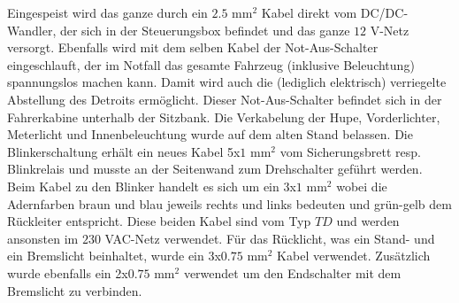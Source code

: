 Eingespeist wird das ganze durch ein $2.5$ mm$^2$ Kabel direkt vom DC/DC-Wandler, der sich in der Steuerungsbox befindet und das ganze $12$ V-Netz versorgt. Ebenfalls wird mit dem selben Kabel der Not-Aus-Schalter eingeschlauft, der im Notfall das gesamte Fahrzeug (inklusive Beleuchtung) spannungslos machen kann. Damit wird auch die (lediglich elektrisch) verriegelte Abstellung des Detroits ermöglicht. Dieser Not-Aus-Schalter befindet sich in der Fahrerkabine unterhalb der Sitzbank. Die Verkabelung der Hupe, Vorderlichter, Meterlicht und Innenbeleuchtung wurde auf dem alten Stand belassen. Die Blinkerschaltung erhält ein neues Kabel 5x$1$ mm$^2$ vom Sicherungsbrett resp. Blinkrelais und musste an der Seitenwand zum Drehschalter geführt werden. Beim Kabel zu den Blinker handelt es sich um ein 3x$1$ mm$^2$ wobei die Adernfarben braun und blau jeweils rechts und links bedeuten und grün-gelb dem Rückleiter entspricht. Diese beiden Kabel sind vom Typ $TD$ und werden ansonsten im $230$ VAC-Netz verwendet. Für das Rücklicht, was ein Stand- und ein Bremslicht beinhaltet, wurde ein 3x$0.75$ mm$^2$ Kabel verwendet. Zusätzlich wurde ebenfalls ein 2x$0.75$ mm$^2$ verwendet um den Endschalter mit dem Bremslicht zu verbinden.

\color{black}